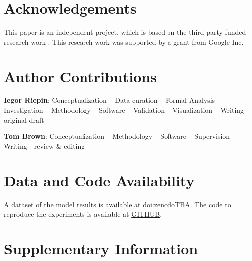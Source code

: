 \documentclass[11pt, 5p, nopreprintline]{elsarticle}
\begin{document}
\section*{Acknowledgements}

This paper is an independent project, which is based on the third-party funded 
research work \cite{Riepin-report-2022}. This research work was supported by a grant from Google Inc. 

\section*{Author Contributions}


\textbf{Iegor Riepin}:
Conceptualization --
Data curation --
Formal Analysis --
Investigation --
Methodology --
Software --
Validation --
Visualization --
Writing - original draft

\textbf{Tom Brown}:
Conceptualization --
Methodology --
Software --
Supervision --
Writing - review \& editing

\section*{Data and Code Availability}

A dataset of the model results is available at \href{zenodoTBA}{doi:zenodoTBA}.
The code to reproduce the experiments is available at \href{https://github.com/repository}{GITHUB}.

\printglossary[type=\acronymtype]

\renewcommand{\ttdefault}{\sfdefault}



\newpage

\makeatletter
\renewcommand \thesection{S\@arabic\c@section}
\renewcommand\thetable{S\@arabic\c@table}
\renewcommand \thefigure{S\@arabic\c@figure}
\makeatother
\renewcommand{\citenumfont}[1]{S#1}
\setcounter{equation}{0}
\setcounter{figure}{0}
\setcounter{table}{0}
\setcounter{section}{0}


\section{Supplementary Information}
\label{sec:si}
 



\renewcommand{\ttdefault}{\sfdefault}
\end{document}
